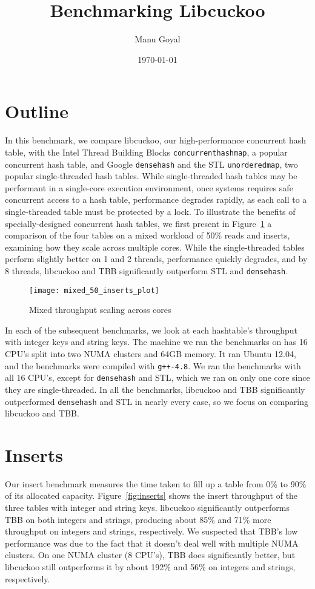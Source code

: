 \documentclass[12pt, letterpaper]{article}
\title{Benchmarking Libcuckoo}
\author{Manu Goyal}
\date{\today}
\newcommand{\myfigwidth}{0.9\textwidth}
\newcommand{\tbbmap}{\texttt{concurrent\textunderscore hash\textunderscore map}}
\newcommand{\densehash}{\texttt{dense\textunderscore hash}}
\newcommand{\unorderedmap}{\texttt{unordered\textunderscore map}}
\begin{document}
\maketitle

\section{Outline}

In this benchmark, we compare libcuckoo, our high-performance concurrent hash
table, with the Intel Thread Building Blocks {\tbbmap}, a popular concurrent
hash table, and Google {\densehash} and the STL {\unorderedmap}, two popular
single-threaded hash tables. While single-threaded hash tables may be performant
in a single-core execution environment, once systems requires safe concurrent
access to a hash table, performance degrades rapidly, as each call to a
single-threaded table must be protected by a lock. To illustrate the benefits of
specially-designed concurrent hash tables, we first present in
Figure~\ref{fig:mixed-threads} a comparison of the four tables on a mixed
workload of 50\% reads and inserts, examining how they scale across multiple
cores. While the single-threaded tables perform slightly better on 1 and 2
threads, performance quickly degrades, and by 8 threads, libcuckoo and TBB
significantly outperform STL and {\densehash}.

\begin{figure}
  \centering
  \texttt{[image: mixed\_50\_inserts\_plot]}
  \caption{Mixed throughput scaling across cores}
  \label{fig:mixed-threads}
\end{figure}

In each of the subsequent benchmarks, we look at each hashtable's throughput
with integer keys and string keys. The machine we ran the benchmarks on has 16
CPU's split into two NUMA clusters and 64GB memory. It ran Ubuntu 12.04, and the
benchmarks were compiled with \texttt{g++-4.8}. We ran the benchmarks with all
16 CPU's, except for {\densehash} and STL, which we ran on only one core since
they are single-threaded. In all the benchmarks, libcuckoo and TBB significantly
outperformed {\densehash} and STL in nearly every case, so we focus on comparing
libcuckoo and TBB.

\section{Inserts}
\label{sec:inserts}

Our insert benchmark measures the time taken to fill up a table from 0\% to 90\%
of its allocated capacity. Figure~\ref{fig:inserts} shows the insert throughput
of the three tables with integer and string keys. libcuckoo significantly
outperforms TBB on both integers and strings, producing about 85\% and 71\% more
throughput on integers and strings, respectively. We suspected that TBB's low
performance was due to the fact that it doesn't deal well with multiple NUMA
clusters. On one NUMA cluster (8 CPU's), TBB does significantly better, but
libcuckoo still outperforms it by about 192\% and 56\% on integers and strings,
respectively.
\end{document}
